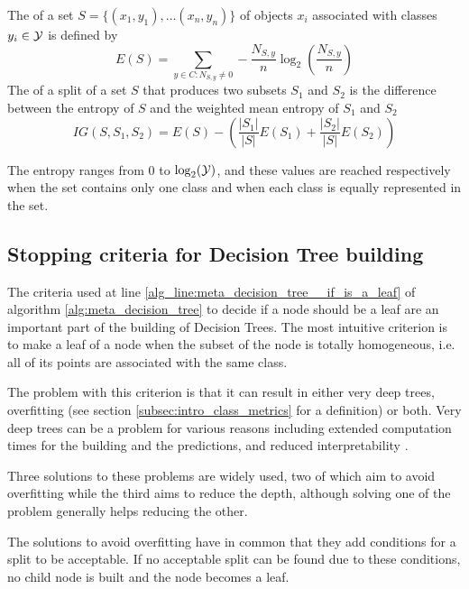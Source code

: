 \begin{definition}
    The  of a set $S = \{(x_1, y_1),\allowbreak\dots (x_n, y_n)\}$ of objects $x_i$ associated with classes $y_i \in \mathcal{Y}$ is defined by
    \begin{equation}
        E(S) = \sum_{y \in C : N_{S, y} \neq 0} -\frac{N_{S, y}}{n} \log_2 \left( \frac{N_{S, y}}{n} \right)
    \end{equation}
    The  of a split of a set $S$ that produces two subsets $S_1$ and $S_2$ is the difference between the entropy of $S$ and the weighted mean entropy of $S_1$ and $S_2$
    \begin{equation}
        IG(S, S_1, S_2) = E(S) - \left(\frac{|S_1|}{|S|} E(S_1) + \frac{|S_2|}{|S|} E(S_2)\right)
    \end{equation}
\end{definition}
The entropy ranges from 0 to $\log_2(\mathcal{Y})$, and these values are reached respectively when the set contains only one class and when each class is equally represented in the set.

\subsection{Stopping criteria for Decision Tree building}
The criteria used at line \ref{alg_line:meta_decision_tree__if_is_a_leaf} of algorithm \ref{alg:meta_decision_tree} to decide if a node should be a leaf are an important part of the building of Decision Trees. The most intuitive criterion is to make a leaf of a node when the subset of the node is totally homogeneous, i.e. all of its points are associated with the same class.

The problem with this criterion is that it can result in either very deep trees, overfitting (see section \ref{subsec:intro_class_metrics} for a definition) or both. Very deep trees can be a problem for various reasons including extended computation times for the building and the predictions, and reduced interpretability . 

Three solutions to these problems are widely used, two of which aim to avoid overfitting while the third aims to reduce the depth, although solving one of the problem generally helps reducing the other.

The solutions to avoid overfitting have in common that they add conditions for a split to be acceptable. If no acceptable split can be found due to these conditions, no child node is built and the node becomes a leaf.

